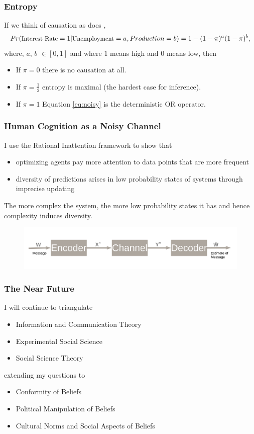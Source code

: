 \documentclass{beamer}
\begin{document}
\begin{frame}
\frametitle{Entropy}
If we think of causation as does \citet{Pearl88}, 
\begin{equation}
\small
\label{eq:noisy}
Pr(\text{Interest Rate}=1|\text{Unemployment}=a, Production=b)= 1-(1-\pi)^a(1-\pi)^b,
\end{equation}
\normalsize
where, $a$, $b$ $\in \left[0, 1\right]$ and where $1$ means high and $0$ means low, then 
\begin{itemize}
\item If $\pi=0$ there is no causation at all.
\item If $\pi=\frac{1}{2}$ entropy is maximal (the hardest case for inference).
\item If $\pi=1$ Equation \ref{eq:noisy} is the deterministic OR operator.
\end{itemize}
\end{frame}
\begin{frame}
\frametitle{Human Cognition as a Noisy Channel}
I use the Rational Inattention framework \citep{Woodford12} to show that
\begin{itemize} 
\item optimizing agents pay more attention to data points that are more frequent 
\item diversity of predictions arises in low probability states of systems through imprecise updating 
\end{itemize}
The more complex the system, the more low probability states it has and hence complexity induces diversity.   
\begin{figure}
\includegraphics[width=\textwidth]{Channel.pdf}
\end{figure}

\end{frame}
\begin{frame}
\frametitle{The Near Future}
I will continue to triangulate 
\begin{itemize}
\item Information and Communication Theory
\item Experimental Social Science
\item Social Science Theory
\end{itemize}
extending my questions to
\begin{itemize}
\item Conformity of Beliefs
\item Political Manipulation of Beliefs
\item Cultural Norms and Social Aspects of Beliefs
\end{itemize}
\end{frame}

\end{document}
